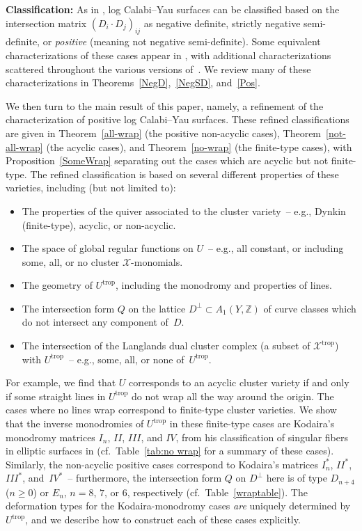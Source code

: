 \documentclass[10pt,a4paper]{amsart}
\numberwithin{equation}{section}
\numberwithin{figure}{section}
\numberwithin{table}{section}
\DeclareMathOperator{\trop}{trop}
\let\bb=\mathbb
\let\s=\mathcal
\theoremstyle{definition}
\begin{document}
{\bf Classification:} As in \cite{GHK1, GHK2}, log Calabi--Yau surfaces can be classified based on the intersection matrix $(D_i\cdot D_j)_{ij}$ as negative definite, strictly negative semi-definite, or \textit{positive} (meaning not negative semi-definite). Some equivalent characterizations of these cases appear in \cite[Lem\-ma~6.9]{GHK1}, with additional characterizations scattered throughout the various versions of~\cite{GHK1, GHK2}. We review many of these characterizations in Theorems~\ref{NegD},~\ref{NegSD}, and~\ref{Pos}.

We then turn to the main result of this paper, namely, a refinement of the characterization of positive log Calabi--Yau surfaces. These refined classifications are given in Theorem~\ref{all-wrap} (the positive non-acyclic cases), Theorem~\ref{not-all-wrap} (the acyclic cases), and Theorem~\ref{no-wrap} (the finite-type cases), with Proposition~\ref{SomeWrap} separating out the cases which are acyclic but not finite-type. The refined classification is based on several different properties of these varieties, including (but not limited to):
\begin{itemize}\itemsep=0pt
\item The properties of the quiver associated to the cluster variety~-- e.g., Dynkin (finite-type), acyclic, or non-acyclic.
\item The space of global regular functions on $U$~-- e.g., all constant, or including some, all, or no cluster $\s{X}$-monomials.
\item The geometry of $U^{\trop}$, including the monodromy and properties of lines.
\item The intersection form $Q$ on the lattice $D^{\perp}\subset A_1(Y,\bb{Z})$ of curve classes which do not intersect any component of~$D$.
\item The intersection of the Langlands dual cluster complex (a subset of $\s{X}^{\trop}$) with $U^{\trop}$~-- e.g., some, all, or none of~$U^{\trop}$.
\end{itemize}

For example, we find that $U$ corresponds to an acyclic cluster variety if and only if some straight lines in $U^{\trop}$ do not wrap all the way around the origin. The cases where no lines wrap correspond to finite-type cluster varieties. We show that the inverse monodromies of $U^{\trop}$ in these finite-type cases are Kodaira's monodromy matrices $I_n$, $II$, $III$, and $IV$, from his classification of singular fibers in elliptic surfaces in \cite{Kod} (cf.\ Table~\ref{tab:no wrap} for a summary of these cases). Similarly, the non-acyclic positive cases correspond to Kodaira's matrices $I_n^*$, $II^*$, $III^*$, and~$IV^*$~-- furthermore, the intersection form $Q$ on $D^{\perp}$ here is of type $D_{n+4}$ ($n\geq 0$) or $E_n$, $n=8$, $7$, or $6$, respectively (cf.\ Table~\ref{wraptable}). The deformation types for the Kodaira-monodromy cases {\it are} uniquely determined by $U^{\trop}$, and we describe how to construct each of these cases explicitly.
\end{document}
